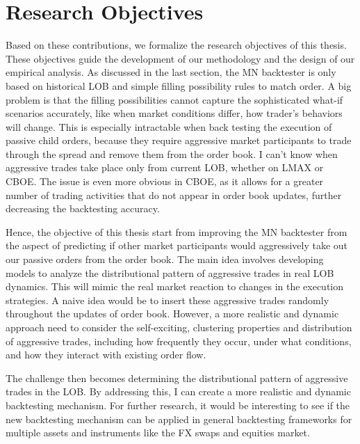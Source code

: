 \section{Research Objectives}\label{sec:researchobjectives}
Based on these contributions, we formalize the research objectives of this thesis. These objectives guide the development of our methodology and the design of our empirical analysis.
As discussed in the last section, the MN backtester is only based on historical LOB and simple filling possibility rules to match order. A big problem is that the filling possibilities cannot capture the sophisticated what-if scenarios accurately, like when market conditions differ, how trader's behaviors will change. This is especially intractable when back testing the execution of passive child orders, because they require aggressive market participants to trade through the spread and remove them from the order book. I can't know when aggressive trades take place only from current LOB, whether on LMAX or CBOE. The issue is even more obvious in CBOE, as it allows for a greater number of trading activities that do not appear in order book updates, further decreasing the backtesting accuracy. 

Hence, the objective of this thesis start from improving the MN backtester from the aspect of predicting if other market participants would aggressively take out our passive orders from the order book. The main idea involves developing models to analyze the distributional pattern of aggressive trades in real LOB dynamics. This will mimic the real market reaction to changes in the execution strategies. A naive idea would be to insert these aggressive trades randomly throughout the updates of order book. However, a more realistic and dynamic approach need to consider the self-exciting, clustering properties and distribution of aggressive trades, including how frequently they occur, under what conditions, and how they interact with existing order flow.

The challenge then becomes determining the distributional pattern of aggressive trades in the LOB. By addressing this, I can create a more realistic and dynamic backtesting mechanism. For further research, it would be interesting to see if the new backtesting mechanism can be applied in general backtesting frameworks for multiple assets and instruments like the FX swaps and equities market.

